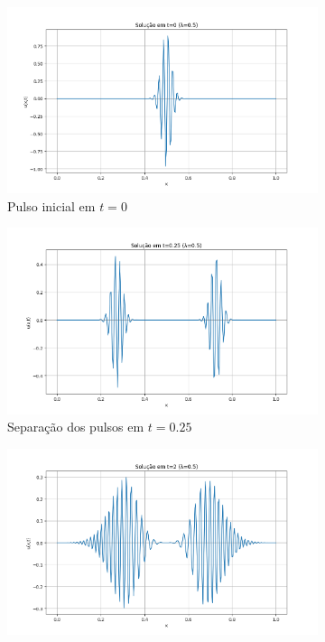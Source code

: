 \documentclass[column,amsmath,amssymb,floatfix]{revtex4}
\begin{document}
\begin{figure}[H]
 \centering
 \begin{subfigure}{0.35\textwidth}
     \includegraphics[width=\textwidth]{img/ex0305.png}
     \caption{Pulso inicial em $t=0$}
     \label{fig:ex3_5}
 \end{subfigure}
 \begin{subfigure}{0.35\textwidth}
     \includegraphics[width=\textwidth]{img/ex0306.png}
     \caption{Separação dos pulsos em $t=0.25$}
     \label{fig:ex3_6}
 \end{subfigure}
 \begin{subfigure}{0.35\textwidth}
     \includegraphics[width=\textwidth]{img/ex0307.png}

\end{subfigure}
\end{figure}
\end{document}
